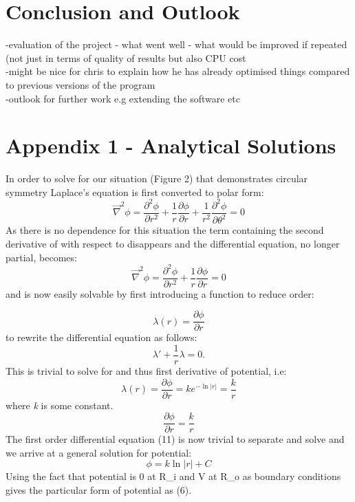 \documentclass{article}
\begin{document}
\section{Conclusion and Outlook}
-evaluation of the project - what went well - what would be improved if repeated (not just in terms of quality of results but also CPU cost\\
-might be nice for chris to explain how he has already optimised things compared to previous versions of the program \\
-outlook for further work e.g extending the software etc \\

\newpage
\section{Appendix 1 - Analytical Solutions}
In order to solve for our situation (Figure 2) that demonstrates circular symmetry Laplace's equation is first converted to polar form:
\begin{equation}
\vec{\nabla}^2\phi = \frac{\partial^2\phi}{\partial r^2}+\frac{1}{r}\frac{\partial\phi}{\partial r}+\frac{1}{r^2} \frac{\partial^2\phi}{\partial\theta^2}=0
\label{6}
\end{equation}
As there is no \theta\) dependence for this situation the term containing the second derivative of \phi\) with respect to \theta\) disappears and the differential equation, no longer partial, becomes:
\begin{equation}
\vec{\nabla}^2\phi = \frac{\partial^2\phi}{\partial r^2}+\frac{1}{r}\frac{\partial\phi}{\partial r}=0
\label{8}
\end{equation}
and is now easily solvable by first introducing a function to reduce order:


\begin{equation}
\lambda(r) = \frac{\partial\phi}{\partial r}
\label{10}
\end{equation}
to rewrite the differential equation as follows: 
\begin{equation}
\lambda ' + \frac{1}{r}\lambda = 0.
\label{11}
\end{equation}
This is trivial to solve for \lambda\) and thus first derivative of potential,  i.e:
\begin{equation}
\lambda(r) =  \frac{\partial\phi}{\partial r} = ke^{-\ln|r|} = \frac{k}{r}
\label{11}
\end{equation}
where \textit{k} is some constant.
\begin{equation}
 \frac{\partial\phi}{\partial r} = \frac{k}{r}
\label{11}
\end{equation}
The first order differential equation (11) is now trivial to separate and solve and we arrive at a general solution for potential:
\begin{equation}
\phi = k\ln|r| + C
\label{11}
\end{equation}
Using the fact that potential is 0 at R_i\) and V at R_o\) as boundary conditions gives the particular form of potential as (6). \\







\end{document}
